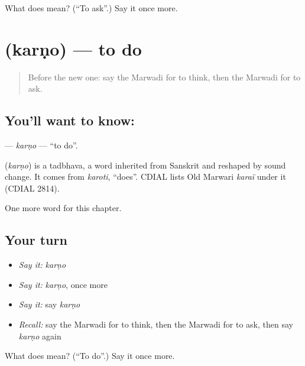 \begin{tcolorbox}[breakable,colback=teal!4,colframe=teal!35!black,title={Before you move on}]
What does  mean? (\textquotedblleft{}To ask\textquotedblright{}.) Say it once more.
\end{tcolorbox}
\section[\texorpdfstring{\mw{करणो} (karṇo)}{करणो (karṇo)}]{ (karṇo) — to do}

\label{lesson:MW-C58-karno}



\begin{quote}
Before the new one: say the Marwadi for to think, then the Marwadi for to ask.
\end{quote}

\subsection*{You'll want to know: }
\textbf{} — \emph{karṇo} — \textquotedblleft{}to do\textquotedblright{}.

\begin{cousinweb}
\textbf{} (\emph{karṇo}) is a tadbhava, a word inherited from Sanskrit and reshaped by sound change. It comes from \emph{karoti}, \textquotedblleft{}does\textquotedblright{}. CDIAL lists Old Marwari \emph{karaï} under it (CDIAL 2814).
\end{cousinweb}

\begin{grammarlens}[title={What you've built}]
One more word for this chapter.
\end{grammarlens}

\subsection*{Your turn}
\begin{itemize}
\raggedright
  \item \emph{Say it:} \emph{karṇo}
  \item \emph{Say it:} \emph{karṇo}, once more
  \item \emph{Say it:} say \emph{karṇo}
  \item \emph{Recall:} say the Marwadi for to think, then the Marwadi for to ask, then say \emph{karṇo} again
\end{itemize}

\begin{tcolorbox}[breakable,colback=teal!4,colframe=teal!35!black,title={Before you move on}]
What does  mean? (\textquotedblleft{}To do\textquotedblright{}.) Say it once more.
\end{tcolorbox}
